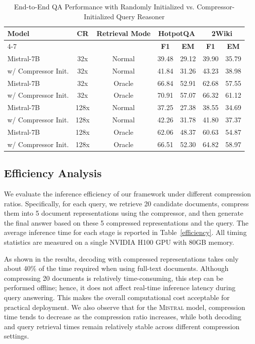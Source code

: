 \documentclass{applemlr}
\numberwithin{equation}{section}
\begin{document}
\begin{table}[H]
\scriptsize
\centering
\label{tab:qa_random_vs_copy}
\begin{tabular}{l|c|c|cc|cc}
\bottomrule
\multirow{2}{*}{\textbf{Model}} & \multirow{2}{*}{\textbf{CR}} & \multirow{2}{*}{\textbf{Retrieval Mode}} 
& \multicolumn{2}{c|}{\textbf{HotpotQA}} 
& \multicolumn{2}{c}{\textbf{2Wiki}} \\ 
\cline{4-7}
 &  &  & \textbf{F1} & \textbf{EM} & \textbf{F1} & \textbf{EM} \\ 
\hline
Mistral-7B & 32x & Normal & 39.48 & 29.12 & 39.90 & 35.79 \\
\quad w/ Compressor Init.
& 32x & Normal & 41.84 & 31.26 & 43.23 & 38.98 \\
Mistral-7B & 32x & Oracle & 66.84 & 52.91 & 62.68 & 57.55 \\
\quad w/ Compressor Init.
 & 32x & Oracle & 70.91 & 57.07 & 66.32 & 61.12 \\
Mistral-7B & 128x & Normal & 37.25 & 27.38 & 38.55 & 34.69 \\
\quad w/ Compressor Init.
& 128x & Normal & 42.26 & 31.78 & 41.80 & 37.37 \\
Mistral-7B & 128x & Oracle & 62.06 & 48.37 & 60.63 & 54.87 \\
\quad w/ Compressor Init.
& 128x & Oracle & 66.51 & 52.30 & 64.82 & 58.97 \\
\hline
\end{tabular}
\caption{End-to-End QA Performance with Randomly Initialized vs. Compressor-Initialized Query Reasoner}
\label{tab:reasoner_init}
\end{table}

\subsection{Efficiency Analysis}
We  evaluate the inference efficiency of our framework under different compression ratios. 
Specifically, for each query, we retrieve 20 candidate documents, compress them into 5 document representations using the compressor, 
and then generate the final answer based on these 5 compressed representations and the query. 
The average inference time for each stage is reported in Table~\ref{efficiency}. All timing statistics are measured on a single NVIDIA H100 GPU with 80GB memory.

As shown in the results, decoding with compressed representations takes only about 40\% of the time required when using full-text documents. 
Although compressing 20 documents is relatively time-consuming, this step can be performed offline; hence, it does not affect real-time inference latency during query answering. 
This makes the overall computational cost acceptable for practical deployment. 
We also observe that for the \textsc{Mistral} model, compression time tends to decrease as the compression ratio increases, 
while both decoding and query retrieval times remain relatively stable across different compression settings. 
\end{document}
